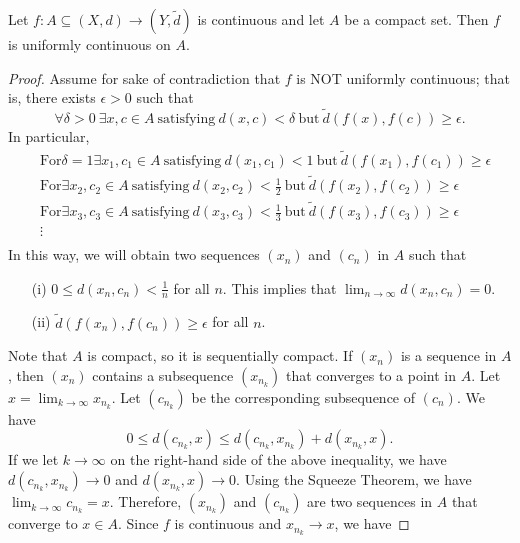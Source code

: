\documentclass[a4paper]{article}
\begin{document}
\begin{theorem}
    Let \( f: A \subseteq  (X,d) \to (Y,\tilde{d}) \) is continuous and let \( A  \) be a compact set. Then \( f  \) is uniformly continuous on \( A  \).
\end{theorem}

\begin{proof}
Assume for sake of contradiction that \( f  \) is NOT uniformly continuous; that is, there exists \( \epsilon > 0  \) such that 
\[  \forall \delta > 0 \ \exists x,c \in A \ \text{satisfying} \ d(x,c) < \delta \ \text{but} \ \tilde{d}(f(x), f(c)) \geq \epsilon. \]
In particular, 
\begin{align*}
    &\text{For} \delta = 1 \exists {x}_{1}, {c}_{1} \in A \ \text{satisfying} \ d({x}_{1}, {c}_{1}) < 1 \ \text{but} \ \tilde{d}(f({x}_{1}), f({c}_{1})) \geq \epsilon \\
    &\text{For} \exists {x}_{2}, {c}_{2} \in A \ \text{satisfying} \ d({x}_{2}, {c}_{2}) < \frac{ 1 }{ 2 }  \ \text{but} \ \tilde{d}(f({x}_{2}), f({c}_{2})) \geq \epsilon   \\
    &\text{For} \exists {x}_{3}, {c}_{3} \in A \ \text{satisfying} \ d({x}_{3}, {c}_{3})  < \frac{ 1 }{ 3 } \ \text{but} \ \tilde{d}(f({x}_{3}), f({c}_{3})) \geq \epsilon \\
               &\vdots \\
\end{align*}
In this way, we will obtain two sequences \( ({x}_{n}) \) and \( ({c}_{n}) \) in \( A  \) such that 
\begin{enumerate}
    \item[(i)] \( 0 \leq d({x}_{n}, {c}_{n}) < \frac{ 1 }{ n }  \) for all \( n  \). This implies that \( \lim_{ n \to \infty  } d({x}_{n}, {c}_{n}) = 0 \).
    \item[(ii)] \( \tilde{d}(f({x}_{n}), f({c}_{n})) \geq \epsilon \) for all \( n \).
\end{enumerate}
Note that \( A \) is compact, so it is sequentially compact. If \( ({x}_{n}) \) is a sequence in \( A  \), then \( ({x}_{n}) \) contains a subsequence \( ({x}_{{n}_{k }}) \) that converges to a point in \( A  \). Let \( x = \lim_{ k  \to \infty  }  {x}_{{n}_{k}} \). Let \( ({c}_{{n}_{k}}) \) be the corresponding subsequence of \( ({c}_{n}) \). We have 
\[  0 \leq d({c}_{{n}_{k}}, x) \leq d({c}_{{n}_{k}}, {x}_{{n}_{k}}) + d({x}_{{n}_{k}}, x). \]
If we let \( k \to \infty   \) on the right-hand side of the above inequality, we have \( d({c}_{{n}_{k}}, {x}_{{n}_{k }}) \to 0  \) and \( d({x}_{{n}_{k}}, x) \to 0  \). Using the Squeeze Theorem, we have \( \lim_{ k  \to \infty  }  {c}_{{n}_{k }} = x  \). Therefore, \( ({x}_{{n}_{k }}) \) and \( ({c}_{{n}_{k}}) \) are two sequences in \( A  \) that converge to \( x \in A  \). Since \( f  \) is continuous and \( {x}_{{n}_{k}} \to x  \), we have 

\end{proof}
\end{document}
